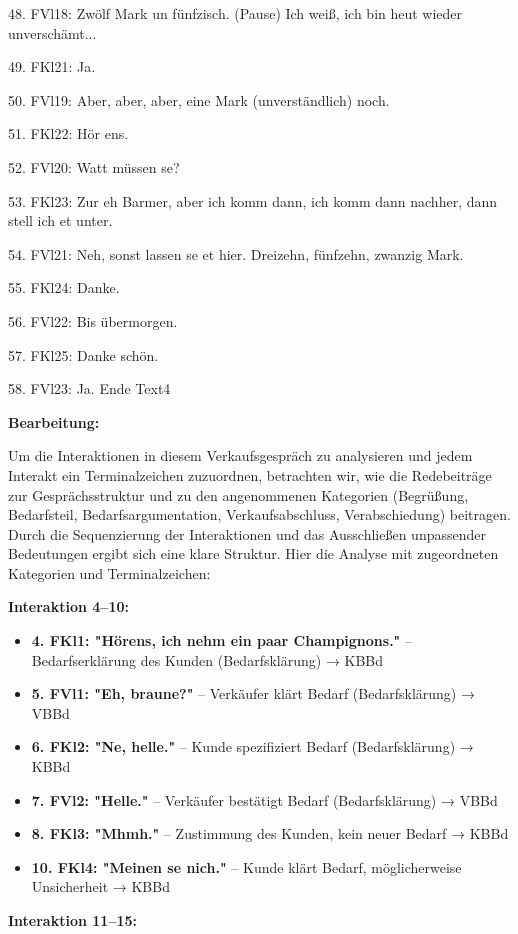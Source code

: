 \documentclass[
]{article}
\begin{document}
48. FVl18: Zwölf Mark un fünfzisch. (Pause) Ich weiß, ich bin heut
wieder unverschämt...

49. FKl21: Ja.

50. FVl19: Aber, aber, aber, eine Mark (unverständlich) noch.

51. FKl22: Hör ens.

52. FVl20: Watt müssen se?

53. FKl23: Zur eh Barmer, aber ich komm dann, ich komm dann nachher,
dann stell ich et unter.

54. FVl21: Neh, sonst lassen se et hier. Dreizehn, fünfzehn, zwanzig
Mark.

55. FKl24: Danke.

56. FVl22: Bis übermorgen.

57. FKl25: Danke schön.

58. FVl23: Ja. Ende Text4

\textbf{Bearbeitung:}

Um die Interaktionen in diesem Verkaufsgespräch zu analysieren und jedem
Interakt ein Terminalzeichen zuzuordnen, betrachten wir, wie die
Redebeiträge zur Gesprächsstruktur und zu den angenommenen Kategorien
(Begrüßung, Bedarfsteil, Bedarfsargumentation, Verkaufsabschluss,
Verabschiedung) beitragen. Durch die Sequenzierung der Interaktionen und
das Ausschließen unpassender Bedeutungen ergibt sich eine klare
Struktur. Hier die Analyse mit zugeordneten Kategorien und
Terminalzeichen:

\textbf{Interaktion 4--10:}

\begin{itemize}
\item
  \textbf{4. FKl1: "Hörens, ich nehm ein paar Champignons."} --
  Bedarfserklärung des Kunden (Bedarfsklärung) → KBBd
\item
  \textbf{5. FVl1: "Eh, braune?"} -- Verkäufer klärt Bedarf
  (Bedarfsklärung) → VBBd
\item
  \textbf{6. FKl2: "Ne, helle."} -- Kunde spezifiziert Bedarf
  (Bedarfsklärung) → KBBd
\item
  \textbf{7. FVl2: "Helle."} -- Verkäufer bestätigt Bedarf
  (Bedarfsklärung) → VBBd
\item
  \textbf{8. FKl3: "Mhmh."} -- Zustimmung des Kunden, kein neuer Bedarf
  → KBBd
\item
  \textbf{10. FKl4: "Meinen se nich."} -- Kunde klärt Bedarf,
  möglicherweise Unsicherheit → KBBd
\end{itemize}

\textbf{Interaktion 11--15:}
\end{document}

